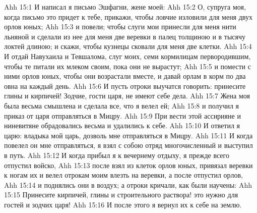 \vs Ahh 15:1
И написал я письмо Эшфагни, жене моей:
\vs Ahh 15:2
О, супруга моя, когда письмо это придет к тебе, прикажи, чтобы ловчие изловили для меня двух орлов юных;
\vs Ahh 15:3
и повели; чтобы слуги мои принесли для меня нити льняной и сделали из нее для меня две веревки в палец толщиною и в тысячу локтей длиною; и скажи, чтобы кузнецы сковали для меня две клетки.
\vs Ahh 15:4
И отдай Навухаила и Тевшалома, слуг моих, семи кормилицам первородившим, чтобы те питали их млеком своим, пока они не вырастут;
\vs Ahh 15:5
и помести с ними орлов юных, чтобы они возрастали вместе, и давай орлам в корм по два овна на каждый день.
\vs Ahh 15:6
И пусть отроки выучатся говорить: принесите глины и кирпичей! Зодчие, гости царя, не имеют себе дела.
\vs Ahh 15:7
Жена моя была весьма смышлена и сделала все, что я велел ей;
\vs Ahh 15:8
и получил я приказ от царя отправляться в Мицру.
\vs Ahh 15:9
При вести этой ассирияне и ниневитяне обрадовались весьма и удалились к себе.
\vs Ahh 15:10
И ответил я царю: владыка мой царь, дозволь мне отправляться в Мицру.
\vs Ahh 15:11
И когда повелел он мне отправляться, я взял с собою отряд многочисленный и выступил в путь.
\vs Ahh 15:12
И когда прибыл я к вечернему отдыху, я прежде всего отпустил войско,
\vs Ahh 15:13
после взял из клеток орлов юных, привязал веревки к ногам их и велел отрокам моим влезть на веревки, а после отпустил орлов,
\vs Ahh 15:14
и поднялись они в воздух; а отроки кричали, как были научены:
\vs Ahh 15:15
Принесите кирпичей, глины и строительного раствора! это нужно для гостей и зодчих царя!
\vs Ahh 15:16
И после этого я вернул их к себе на землю.

